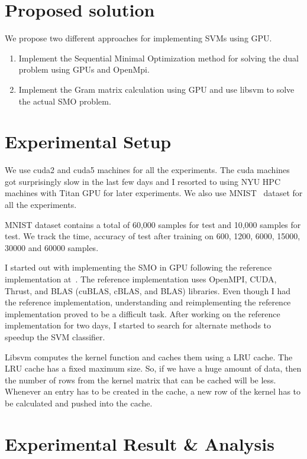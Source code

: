 \documentclass{article}
\begin{document}
\section{Proposed solution}
We propose two different approaches for implementing SVMs using GPU\@.

\begin{enumerate}
\item Implement the Sequential Minimal Optimization method for solving the dual problem using GPUs and OpenMpi.
\item Implement the Gram matrix calculation using GPU and use libsvm to solve the actual SMO problem.
\end{enumerate}

\section{Experimental Setup}
We use cuda2 and cuda5 machines for all the experiments.
The cuda machines got surprisingly slow in the last few days and I resorted to using NYU HPC machines with Titan GPU for later experiments.
We also use MNIST~\cite{lecun1998mnist} dataset for all the experiments.

MNIST dataset contains a total of 60,000 samples for test and 10,000 samples for test.
We track the time, accuracy of test after training on 600, 1200, 6000, 15000, 30000 and 60000 samples.


I started out with implementing the SMO in GPU following the reference implementation at~\cite{dpsvm}.
The reference implementation uses OpenMPI, CUDA, Thrust, and BLAS (cuBLAS, cBLAS, and BLAS) libraries.
Even though I had the reference implementation, understanding and reimplementing the reference implementation proved to be a difficult task.
After working on the reference implementation for two days, I started to search for alternate methods to speedup the SVM classifier.


Libsvm computes the kernel function and caches them using a LRU cache.
The LRU cache has a fixed maximum size.  
So, if we have a huge amount of data, then the number of rows from the kernel matrix that can be cached will be less.
Whenever an entry has to be created in the cache, a new row of the kernel has to be calculated and pushed into the cache.

\section{Experimental Result \& Analysis}
\end{document}
